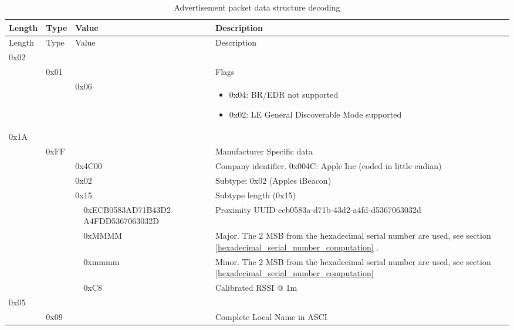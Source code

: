 \documentclass[a4paper]{article}
\newcommand{\secref}[1]{\ref{#1} \nameref{#1}}
\begin{document}
\begingroup
\renewcommand*{\arraystretch}{1.4} %
\begin{longtable}[]{ p{0.8cm}  p{0.8cm}  p{0.1cm}  p{4cm} p{9cm} }
	\caption{Advertisement packet data structure decoding}
	\label{table.3} 
	\tabularnewline
	\toprule\noalign{}
	Length & Type & \multicolumn{2}{l}{Value} & Description \\
	\midrule\noalign{}
	\endfirsthead
	\toprule\noalign{}
	Length & Type & \multicolumn{2}{l}{Value} & Description \\
	\midrule\noalign{}
	\endhead
	\bottomrule\noalign{}
	\endlastfoot
	0x02 & &  \multicolumn{2}{l}{} & \\ 
	& 0x01 & \multicolumn{2}{l}{} & Flags \\
	& & \multicolumn{2}{l}{0x06} & \begin{itemize}
	\item
	0x04: BR/EDR not supported
	\item
	0x02: LE General Discoverable Mode supported
	\end{itemize} \\
	0x1A & & \multicolumn{2}{l}{} & \\
	& 0xFF & \multicolumn{2}{l}{} & Manufacturer Specific data \\
	& & \multicolumn{2}{l}{0x4C00} & Company identifier. 0x004C: Apple Inc (coded in little endian) \\
	& & \multicolumn{2}{l}{0x02} & Subtype: 0x02 (Apple\textquotesingle s iBeacon) \\
	& & \multicolumn{2}{l}{0x15} & Subtype length (0x15) \\
	  &   &   & 0xECB0583AD71B43D2 A4FDD5367063032D & Proximity UUID ecb0583a-d71b-43d2-a4fd-d5367063032d                       \\
	  &   &   & 0xMMMM                              & Major. The 2 MSB from the hexadecimal serial number are used, see section 
	\secref{hexadecimal_serial_number_computation}. \\
	  &   &   & 0xmmmm                              & Minor. The 2 MSB from the hexadecimal serial number are used, see section 
	\secref{hexadecimal_serial_number_computation} \\
	  &   &   & 0xC8                                & Calibrated RSSI @ 1m                                                      \\
	0x05 & & \multicolumn{2}{l}{} & \\
	& 0x09 & \multicolumn{2}{l}{} & Complete Local Name in ASCI \\

\end{longtable}
\end{document}
